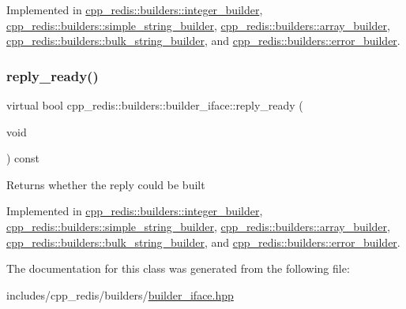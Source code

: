 Implemented in \hyperlink{classcpp__redis_1_1builders_1_1integer__builder_ae29f074134f7269db7f947b0fcbe312e}{cpp\+\_\+redis\+::builders\+::integer\+\_\+builder}, \hyperlink{classcpp__redis_1_1builders_1_1simple__string__builder_a159bb512f0427c4a988742f7cd01035e}{cpp\+\_\+redis\+::builders\+::simple\+\_\+string\+\_\+builder}, \hyperlink{classcpp__redis_1_1builders_1_1array__builder_a043357d0ef70406adef4df78c8d5307f}{cpp\+\_\+redis\+::builders\+::array\+\_\+builder}, \hyperlink{classcpp__redis_1_1builders_1_1bulk__string__builder_a43000357f87212f657aafe279a92b541}{cpp\+\_\+redis\+::builders\+::bulk\+\_\+string\+\_\+builder}, and \hyperlink{classcpp__redis_1_1builders_1_1error__builder_af5ac542be148d6f8500de79fa3164798}{cpp\+\_\+redis\+::builders\+::error\+\_\+builder}.

\mbox{\label{classcpp__redis_1_1builders_1_1builder__iface_a40db9a31d4ea1771777e74146d31e12d}} 
\subsubsection{\texorpdfstring{reply\+\_\+ready()}{reply\_ready()}}
{\footnotesize\ttfamily virtual bool cpp\+\_\+redis\+::builders\+::builder\+\_\+iface\+::reply\+\_\+ready (\begin{DoxyParamCaption}\item[{void}]{ }\end{DoxyParamCaption}) const\hspace{0.3cm}{\ttfamily [pure virtual]}}

\begin{DoxyReturn}{Returns}
whether the reply could be built 
\end{DoxyReturn}


Implemented in \hyperlink{classcpp__redis_1_1builders_1_1integer__builder_a4893dc36d06d75094bb4fe3fbc826966}{cpp\+\_\+redis\+::builders\+::integer\+\_\+builder}, \hyperlink{classcpp__redis_1_1builders_1_1simple__string__builder_ad586164caf02b3022b91789cac23a72d}{cpp\+\_\+redis\+::builders\+::simple\+\_\+string\+\_\+builder}, \hyperlink{classcpp__redis_1_1builders_1_1array__builder_a524f2cb943dde1246dea1b7057e6351e}{cpp\+\_\+redis\+::builders\+::array\+\_\+builder}, \hyperlink{classcpp__redis_1_1builders_1_1bulk__string__builder_a4d80d8dfe305e35aca8b4ec84c56fbea}{cpp\+\_\+redis\+::builders\+::bulk\+\_\+string\+\_\+builder}, and \hyperlink{classcpp__redis_1_1builders_1_1error__builder_af3d67647f012d0a7378684e2f8258a6d}{cpp\+\_\+redis\+::builders\+::error\+\_\+builder}.



The documentation for this class was generated from the following file\+:\begin{DoxyCompactItemize}
\item 
includes/cpp\+\_\+redis/builders/\hyperlink{builder__iface_8hpp}{builder\+\_\+iface.\+hpp}\end{DoxyCompactItemize}
